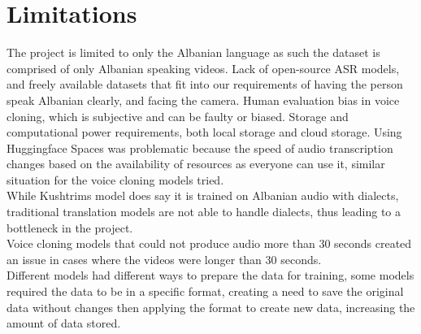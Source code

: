 \documentclass[12pt]{article}
\begin{document}
\section{Limitations}
The project is limited to only the Albanian language as such the dataset is comprised of only Albanian speaking videos. Lack of open-source ASR models, and freely available datasets that fit into our requirements of having the person speak Albanian clearly, and facing the camera. Human evaluation bias in voice cloning, which is subjective and can be faulty or biased. Storage and computational power requirements, both local storage and cloud storage. Using Huggingface Spaces was problematic because the speed of audio transcription changes based on the availability of resources as everyone can use it, similar situation for the voice cloning models tried.\\
While Kushtrims model does say it is trained on Albanian audio with dialects, traditional translation models are not able to handle dialects, thus leading to a bottleneck in the project.\\
Voice cloning models that could not produce audio more than 30 seconds created an issue in cases where the videos were longer than 30 seconds.\\
Different models had different ways to prepare the data for training, some models required the data to be in a specific format, creating a need to save the original data without changes then applying the format to create new data, increasing the amount of data stored.
\end{document}
